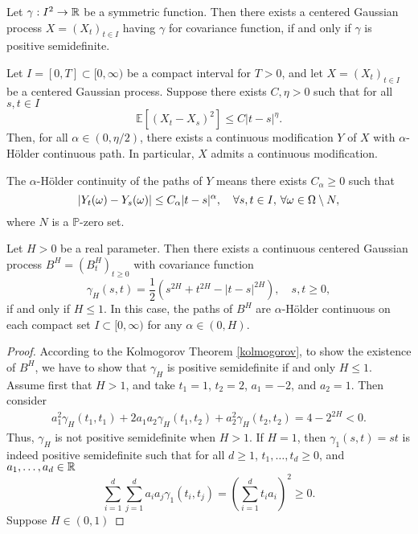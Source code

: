 \begin{thm}\label{kolmogorov}
    Let $\gamma: I^{2}\to\mathbb{R}$ be a symmetric function. Then there exists a centered Gaussian process $X=(X_{t})_{t\in I}$ having $\gamma$ for covariance function, if and only if $\gamma$ is positive semidefinite.
\end{thm}
\begin{lem}
    Let $I=[0,T]\subset [0,\infty)$ be a compact interval for $T>0$, and let $X=(X_{t})_{t\in I}$ be a centered Gaussian process. Suppose there exists $C,\eta>0$ such that for all $s,t\in I$
    \begin{equation}
        \mathbb{E}\left[(X_{t}-X_{s})^{2}\right]\leq C|t-s|^{\eta}.
    \end{equation}
    Then, for all $\alpha\in (0,\eta/2)$, there exists a continuous modification $Y$ of $X$ with $\alpha$-Hölder continuous path. In particular, $X$ admits a continuous modification.
\end{lem}
The $\alpha$-Hölder continuity of the paths of $Y$ means there exists $C_{\alpha}\geq 0$ such that
\begin{equation}
    |Y_{t}(\omega)-Y_{s}(\omega)|\leq C_{\alpha}|t-s|^{\alpha},\quad \forall s,t\in I,\hspace{2 pt}\forall\omega\in\Omega\setminus N,
\end{equation}
where $N$ is a $\mathbb{P}$-zero set.
\begin{thm}
  Let $H>0$ be a real parameter. Then there exists a continuous centered Gaussian process $B^{H}=(B_{t}^{H})_{t\geq 0}$ with covariance function
  \begin{equation}
      \gamma_{H}(s,t)=\frac{1}{2}(s^{2H}+t^{2H}-|t-s|^{2H}), \quad s,t\geq 0,
  \end{equation}
  if and only if $H\leq 1$. In this case, the paths of $B^{H}$ are $\alpha$-Hölder continuous on each compact set $I\subset [0,\infty)$ for any $\alpha\in (0,H)$.
\end{thm}
\begin{proof}
    According to the Kolmogorov Theorem \ref{kolmogorov}, to show the existence of $B^{H}$, we have to show that $\gamma_{H}$ is positive semidefinite if and only $H\leq 1$.
    Assume first that $H>1$, and take $t_{1}=1$, $t_{2}=2$, $a_{1}=-2$, and $a_{2}=1$. Then consider
    \begin{align}
        a_{1}^{2}\gamma_{H}(t_{1},t_{1})+2a_{1}a_{2}\gamma_{H}(t_{1},t_{2})+a_{2}^{2}\gamma_{H}(t_{2},t_{2})=4-2^{2H}<0.
    \end{align}
    Thus, $\gamma_{H}$ is not positive semidefinite when $H>1$. If $H=1$, then $\gamma_{1}(s,t)=st$ is indeed positive semidefinite such that for all $d\geq 1$, $t_{1},\dots,t_{d}\geq 0$, and $a_{1},\dots,a_{d}\in \mathbb{R}$
    \begin{equation}
        \sum_{i=1}^{d}\sum_{j=1}^{d}a_{i}a_{j}\gamma_{1}(t_{i},t_{j})= \left(\sum_{i=1}^{d}t_{i}a_{i}\right)^{2}\geq 0.
    \end{equation}
    Suppose $H\in (0,1)$
\end{proof}
